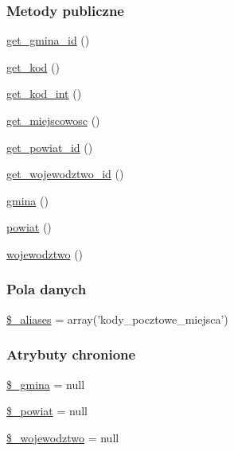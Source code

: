 \subsubsection*{Metody publiczne}
\begin{DoxyCompactItemize}
\item 
\hyperlink{classep___p_n_a_a63aa148dc21ae1078168b2ea9507ac8b}{get\-\_\-gmina\-\_\-id} ()
\item 
\hyperlink{classep___p_n_a_a013f0dbe044fb129e4ddd98598b4e34a}{get\-\_\-kod} ()
\item 
\hyperlink{classep___p_n_a_a7707101ef5dc05d7b439e7d08f1c3d10}{get\-\_\-kod\-\_\-int} ()
\item 
\hyperlink{classep___p_n_a_a256282dfe2df9b8b7173b834b9a80df3}{get\-\_\-miejscowosc} ()
\item 
\hyperlink{classep___p_n_a_a7c13f20e38e0898d072c067a64cb9065}{get\-\_\-powiat\-\_\-id} ()
\item 
\hyperlink{classep___p_n_a_a36399d80f5ab76bb2d958a481f9002ff}{get\-\_\-wojewodztwo\-\_\-id} ()
\item 
\hyperlink{classep___p_n_a_ae13445f31d6a2e43182ca0e2ce2f821d}{gmina} ()
\item 
\hyperlink{classep___p_n_a_afeb09b2f0c7a3cd1d9bfe029ffdd57ea}{powiat} ()
\item 
\hyperlink{classep___p_n_a_a2c735142a4af50d47b17d8103a9ab9ab}{wojewodztwo} ()
\end{DoxyCompactItemize}
\subsubsection*{Pola danych}
\begin{DoxyCompactItemize}
\item 
\hyperlink{classep___p_n_a_ab4e31d75f0bc5d512456911e5d01366b}{\$\-\_\-aliases} = array('kody\-\_\-pocztowe\-\_\-miejsca')
\end{DoxyCompactItemize}
\subsubsection*{Atrybuty chronione}
\begin{DoxyCompactItemize}
\item 
\hyperlink{classep___p_n_a_ab0313b743bc1be610472dfee711e929a}{\$\-\_\-gmina} = null
\item 
\hyperlink{classep___p_n_a_a928275f8378baade592a64f89da229ef}{\$\-\_\-powiat} = null
\item 
\hyperlink{classep___p_n_a_a2a0a830e555a9e31b5118be82dbc33c7}{\$\-\_\-wojewodztwo} = null
\end{DoxyCompactItemize}
